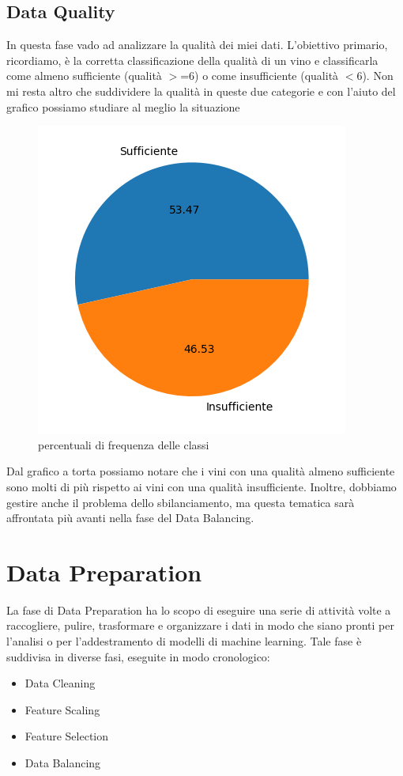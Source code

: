 \documentclass{article}
\begin{document}
\begin{titlepage}
        \newpage
        \subsection{Data Quality}
        In questa fase vado ad analizzare la qualità dei miei dati.
        L'obiettivo primario, ricordiamo, è la corretta classificazione della qualità di un vino e classificarla come almeno sufficiente (qualità \( >\)=6) o come insufficiente (qualità \( <\)6). Non mi resta altro che suddividere la qualità in queste due categorie e con l'aiuto del grafico possiamo studiare al meglio la situazione

        \begin{figure}[ht]
            \centering
            \includegraphics[width=0.5\linewidth]{pie-quality.png}
            \caption{  percentuali di frequenza delle classi}
            \label{fig:enter-label}
        \end{figure}

        Dal grafico a torta possiamo notare che i vini con una qualità almeno sufficiente sono molti di più rispetto ai vini con una qualità insufficiente.        
        Inoltre, dobbiamo gestire anche il problema dello sbilanciamento, ma questa tematica sarà affrontata più avanti nella fase del Data Balancing.

        \section{Data Preparation}
        La fase di Data Preparation ha lo scopo di eseguire una serie di attività volte a raccogliere, pulire, trasformare e organizzare i dati in modo che siano pronti per l'analisi o per l'addestramento di modelli di machine learning.
        Tale fase è suddivisa in diverse fasi, eseguite in modo cronologico:
        \begin{itemize}
            \item Data Cleaning
            \item Feature Scaling
            \item Feature Selection
            \item Data Balancing
        \end{itemize}


\end{titlepage}
\end{document}
